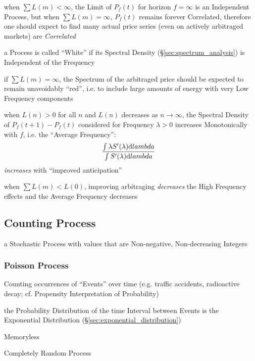 when $\sum L(m) < \infty$, the Limit of $P_f(t)$ for horizon $f = \infty$ is an
Independent Process, but when $\sum L(m) = \infty$, $P_f(t)$ remains forever
Correlated, therefore one should expect to find many actual price series (even
on actively arbitraged markets) are \emph{Correlated}

a Process is called ``White'' if its Spectral Density
(\S\ref{sec:spectrum_analysis}) is Independent of the Frequency

if $\sum L(m) = \infty$, the Spectrum of the arbitraged price should be expected
to remain unavoidably ``red'', i.e. to include large amounts of energy with very
Low Frequency components

when $L(n) > 0$ for all $n$ and $L(n)$ decreases as $n \to \infty$, the Spectral
Density of $P_f(t+1) - P_f(t)$ considered for Frequency $\lambda > 0$ increases
Monotonically with $f$, i.e. the ``Average Frequency'':
\[
  \frac{\int \lambda S'(\lambda) \mathrm{d}lambda}
    {\int S'(\lambda) \mathrm{d}lambda}
\]
\emph{increases} with ``improved anticipation''

when $\sum L(m) < L(0)$, improving arbitraging \emph{decreases} the High
Frequency effects and the Average Frequency decreases



\subsection{Counting Process}\label{sec:counting_process}

a Stochastic Process with values that are Non-negative, Non-decreasing Integers



\subsubsection{Poisson Process}\label{sec:poisson_process}

Counting occurrences of ``Events'' over time (e.g. traffic accidents,
radioactive decay; cf. Propensity Interpretation of Probability)

the Probability Distribution of the time Interval between Events is the
Exponential Distribution (\S\ref{sec:exponential_distribution})

Memoryless

Completely Random Process

